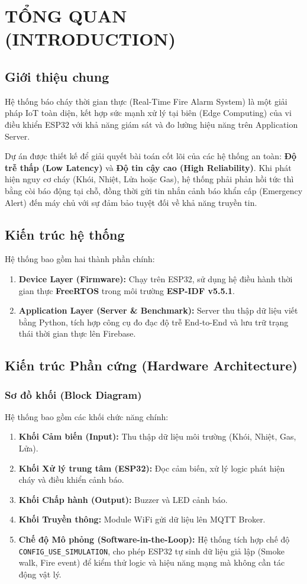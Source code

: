 \documentclass[12pt,a4paper]{report}
\begin{document}
\chapter{TỔNG QUAN (INTRODUCTION)}

\section{Giới thiệu chung}
Hệ thống báo cháy thời gian thực (Real-Time Fire Alarm System) là một giải pháp IoT toàn diện, kết hợp sức mạnh xử lý tại biên (Edge Computing) của vi điều khiển ESP32 với khả năng giám sát và đo lường hiệu năng trên Application Server.

Dự án được thiết kế để giải quyết bài toán cốt lõi của các hệ thống an toàn: \textbf{Độ trễ thấp (Low Latency)} và \textbf{Độ tin cậy cao (High Reliability)}. Khi phát hiện nguy cơ cháy (Khói, Nhiệt, Lửa hoặc Gas), hệ thống phải phản hồi tức thì bằng còi báo động tại chỗ, đồng thời gửi tin nhắn cảnh báo khẩn cấp (Emergency Alert) đến máy chủ với sự đảm bảo tuyệt đối về khả năng truyền tin.

\section{Kiến trúc hệ thống}
Hệ thống bao gồm hai thành phần chính:
\begin{enumerate}
    \item \textbf{Device Layer (Firmware):} Chạy trên ESP32, sử dụng hệ điều hành thời gian thực \textbf{FreeRTOS} trong môi trường \textbf{ESP-IDF v5.5.1}.
    \item \textbf{Application Layer (Server \& Benchmark):} Server thu thập dữ liệu viết bằng Python, tích hợp công cụ đo đạc độ trễ End-to-End và lưu trữ trạng thái thời gian thực lên Firebase.
\end{enumerate}

\section{Kiến trúc Phần cứng (Hardware Architecture)}
\subsection{Sơ đồ khối (Block Diagram)}
Hệ thống bao gồm các khối chức năng chính:
\begin{enumerate}
    \item \textbf{Khối Cảm biến (Input):} Thu thập dữ liệu môi trường (Khói, Nhiệt, Gas, Lửa).
    \item \textbf{Khối Xử lý trung tâm (ESP32):} Đọc cảm biến, xử lý logic phát hiện cháy và điều khiển cảnh báo.
    \item \textbf{Khối Chấp hành (Output):} Buzzer và LED cảnh báo.
    \item \textbf{Khối Truyền thông:} Module WiFi gửi dữ liệu lên MQTT Broker.
    \item \textbf{Chế độ Mô phỏng (Software-in-the-Loop):} Hệ thống tích hợp chế độ \texttt{CONFIG_USE_SIMULATION}, cho phép ESP32 tự sinh dữ liệu giả lập (Smoke walk, Fire event) để kiểm thử logic và hiệu năng mạng mà không cần tác động vật lý.
\end{enumerate}
\end{document}
